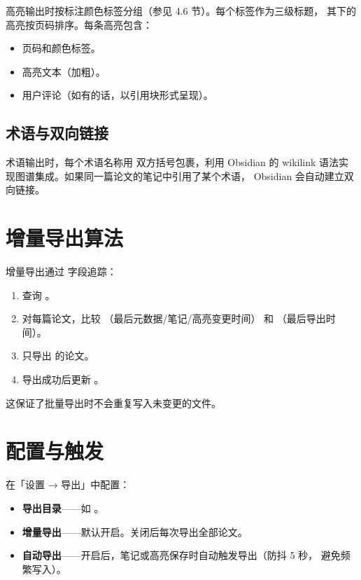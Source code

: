 高亮输出时按标注颜色标签分组（参见 4.6 节）。每个标签作为三级标题，
其下的高亮按页码排序。每条高亮包含：

\begin{itemize}
  \item 页码和颜色标签。
  \item 高亮文本（加粗）。
  \item 用户评论（如有的话，以引用块形式呈现）。
\end{itemize}

\subsection{术语与双向链接}

术语输出时，每个术语名称用 \cmd{[[术语名]]} 双方括号包裹，利用 Obsidian 的
wikilink 语法实现图谱集成。如果同一篇论文的笔记中引用了某个术语，
Obsidian 会自动建立双向链接。

\section{增量导出算法}

增量导出通过  字段追踪：

\begin{enumerate}
  \item 查询 。
  \item 对每篇论文，比较 （最后元数据/笔记/高亮变更时间）
    和 （最后导出时间）。
  \item 只导出  的论文。
  \item 导出成功后更新 。
\end{enumerate}

这保证了批量导出时不会重复写入未变更的文件。

\section{配置与触发}

在「设置 → 导出」中配置：

\begin{itemize}
  \item \textbf{导出目录}——如 。
  \item \textbf{增量导出}——默认开启。关闭后每次导出全部论文。
  \item \textbf{自动导出}——开启后，笔记或高亮保存时自动触发导出（防抖 5 秒，
    避免频繁写入）。
\end{itemize}

